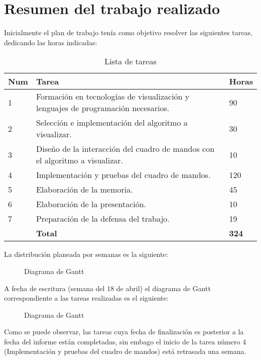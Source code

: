 \chapter{Resumen del trabajo realizado}

Inicialmente el plan de trabajo tenía como objetivo resolver las siguientes tareas, dedicando las horas indicadas:

\begin{table}[h]
\centering
\begin{tabular}{|p{1cm}|p{11.9cm}|p{1.1cm}|}
\hline
\textbf{Num} & \textbf{Tarea} & \textbf{Horas}\\
\hline\hline
1 & Formación en tecnologías de visualización y lenguajes de programación necesarios. & 90\\
\hline
2 & Selección e implementación del algoritmo a visualizar. & 30\\
\hline
3 & Diseño de la interacción del cuadro de mandos con el algoritmo a visualizar. & 10\\
\hline
4 & Implementación y pruebas del cuadro de mandos. & 120\\
\hline
5 & Elaboración de la memoria. & 45\\
\hline
6 & Elaboración de la presentación. & 10\\
\hline
7 & Preparación de la defensa del trabajo. & 19\\
\hline\hline
\textbf{} & \textbf{Total} & \textbf{324}\\
\hline
\end{tabular}
\caption{Lista de tareas}
\end{table}

La distribución planeada por semanas es la siguiente:


\begin{figure}[h]
	{\fontsize{3}{4}\selectfont
		\centering      
    	\def\svgscale{0.185}
    	
    	\caption{Diagrama de Gantt}
	}
\end{figure}

A fecha de escritura (semana del 18 de abril) el diagrama de Gantt correspondiente a las tareas realizadas es el siguiente:

\begin{figure}[h]
	{\fontsize{3}{4}\selectfont
		\centering      
    	\def\svgscale{0.185}
    	
    	\caption{Diagrama de Gantt}
	}
\end{figure}

Como se puede observar, las tareas cuya fecha de finalización es posterior a la fecha del informe están completadas, sin embago el inicio de la tarea número 4 (Implementación y pruebas del cuadro de mandos) está retrasada una semana.